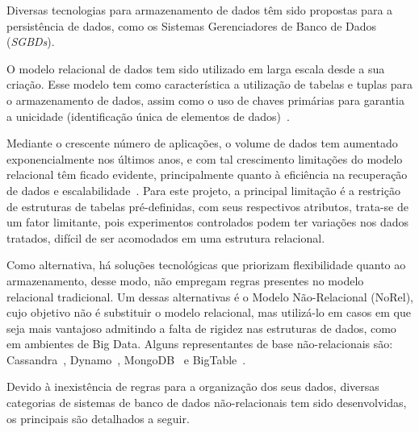 Diversas tecnologias para armazenamento de dados têm sido propostas para a persistência de dados, como os Sistemas Gerenciadores de Banco de Dados (\textit{SGBDs}).

O modelo relacional de dados tem sido utilizado em larga escala desde a sua criação. Esse modelo tem como característica a utilização de tabelas e tuplas para o armazenamento de dados, assim como o uso de chaves primárias para garantia a unicidade (identificação única de elementos de dados)~\cite{brito2010bancos}.

Mediante o crescente número de aplicações, o volume de dados tem aumentado exponencialmente nos últimos anos, e com tal crescimento limitações do modelo relacional têm ficado evidente, principalmente quanto à eficiência na recuperação de dados e escalabilidade~\cite{toth2011abordagem}. Para este projeto, a principal limitação é a restrição de estruturas de tabelas pré-definidas, com seus respectivos atributos, trata-se de um fator limitante, pois experimentos controlados podem ter variações nos dados tratados, difícil de ser acomodados em uma estrutura relacional.

Como alternativa, há soluções tecnológicas que priorizam flexibilidade quanto ao armazenamento, desse modo, não empregam regras presentes no modelo relacional tradicional. Um dessas alternativas é o Modelo Não-Relacional (NoRel), cujo objetivo não é substituir o modelo relacional, mas utilizá-lo em casos em que seja mais vantajoso admitindo a falta de rigidez nas estruturas de dados, como em ambientes de Big Data. Alguns representantes de base não-relacionais são: Cassandra~\cite{cassandra2014apache}, Dynamo~\cite{sivasubramanian2012amazon}, MongoDB~\cite{banker2011mongodb} e BigTable~\cite{chang2008bigtable}.

Devido à inexistência de regras para a organização dos seus dados, diversas categorias de sistemas de banco de dados não-relacionais tem sido desenvolvidas, os principais são detalhados a seguir.

